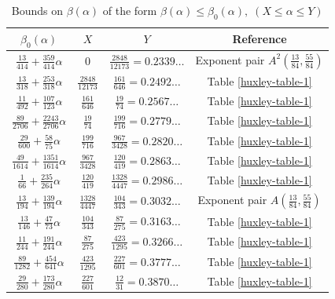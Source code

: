 \begin{table}[ht]
    \def\arraystretch{1.3}
    \centering
    \caption{Bounds on $\beta(\alpha)$ of the form $\beta(\alpha) \le \beta_0(\alpha), \;(X \le \alpha \le Y)$}
    \begin{tabular}{|c|c|c|c|}
    \hline
    $\beta_0(\alpha)$ & $X$ & $Y$ & Reference\\
    \hline
    $ \frac{13}{414} + \frac{359}{414} \alpha $ & $ 0 $ & $ \frac{2848}{12173} = 0.2339\ldots $ & Exponent pair $A^2(\frac{13}{84}, \frac{55}{84})$\\
    \hline
    $\frac{13}{318} + \frac{253}{318} \alpha$ & $\frac{2848}{12173}$ & $\frac{161}{646} = 0.2492\ldots$ & Table \ref{huxley-table-1}\\
    \hline
    $\frac{11}{492} + \frac{107}{123} \alpha$ & $\frac{161}{646}$ & $\frac{19}{74} = 0.2567\ldots$ & Table \ref{huxley-table-1}\\
    \hline
    $ \frac{89}{2706} + \frac{2243}{2706} \alpha $ & $ \frac{19}{74} $ & $ \frac{199}{716} = 0.2779\ldots $ & Table \ref{huxley-table-1}\\
    \hline
    $ \frac{29}{600} + \frac{58}{75} \alpha $ & $ \frac{199}{716} $ & $ \frac{967}{3428} = 0.2820\ldots $ & Table \ref{huxley-table-1}\\
    \hline
    $ \frac{49}{1614} + \frac{1351}{1614} \alpha $ & $ \frac{967}{3428} $ & $ \frac{120}{419} = 0.2863\ldots $ & Table \ref{huxley-table-1}\\
    \hline
    $ \frac{1}{66} + \frac{235}{264} \alpha $ & $ \frac{120}{419} $ & $ \frac{1328}{4447} = 0.2986\ldots $ & Table \ref{huxley-table-1}\\
    \hline
    $ \frac{13}{194} + \frac{139}{194} \alpha $ & $ \frac{1328}{4447} $ & $ \frac{104}{343} = 0.3032\ldots $ & Exponent pair $A(\frac{13}{84}, \frac{55}{84})$\\
    \hline
    $ \frac{13}{146} + \frac{47}{73} \alpha $ & $ \frac{104}{343} $ & $ \frac{87}{275} = 0.3163\ldots $ & Table \ref{huxley-table-1}\\
    \hline
    $ \frac{11}{244} + \frac{191}{244} \alpha $ & $ \frac{87}{275} $ & $ \frac{423}{1295} = 0.3266\ldots $ & Table \ref{huxley-table-1}\\
    \hline
    $ \frac{89}{1282} + \frac{454}{641} \alpha $ & $ \frac{423}{1295} $ & $ \frac{227}{601} = 0.3777\ldots $ & Table \ref{huxley-table-1}\\
    \hline
    $ \frac{29}{280} + \frac{173}{280} \alpha $ & $ \frac{227}{601} $ & $ \frac{12}{31} = 0.3870\ldots $ & Table \ref{huxley-table-1}\\

\end{tabular}
\end{table}
